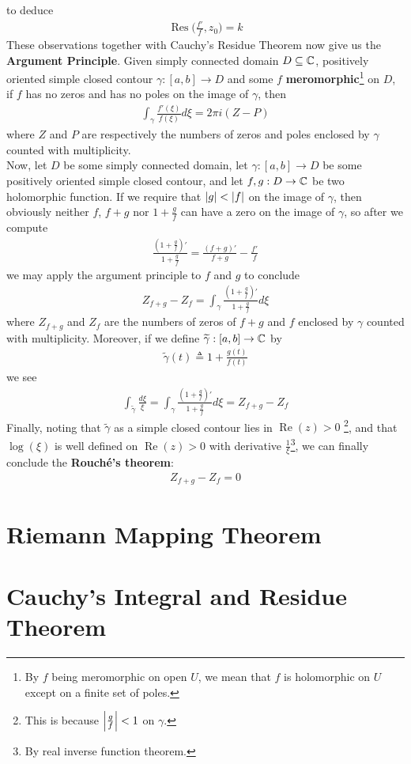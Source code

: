 \documentclass{report}
\begin{document}
to deduce 
\begin{align*}
\operatorname{Res}\Big(\frac{f'}{f},z_0 \Big)=k
\end{align*}
These observations together with Cauchy's Residue Theorem now give us the \textbf{Argument Principle}. Given simply connected domain $D\subseteq \mathbb{C}$, positively oriented simple closed contour $\gamma :[a,b]\rightarrow D$ and some $f$ \textbf{meromorphic}\footnote{By $f$ being meromorphic on open $U$, we mean that $f$ is holomorphic on $U$ except on a finite set of poles.} on $D$, if $f$ has no zeros and has no poles on the image of $\gamma $, then   
\begin{align*}
\int_{\gamma } \frac{f'(\xi)}{f(\xi)}d\xi = 2\pi  i (Z-P)
\end{align*}
where $Z$ and $P$ are respectively the numbers of zeros and poles enclosed by $\gamma $ counted with multiplicity.   \\

Now, let $D$ be some simply connected domain,  let $\gamma :[a,b]\rightarrow D$ be some positively oriented simple closed contour, and let $f,g:D\rightarrow \mathbb{C}$ be two holomorphic function. If we require that $\left|g\right|<\left|f\right|$ on the image of $\gamma $, then obviously neither $f$, $f+g$ nor $1+\frac{g}{f}$ can have a zero on the image of $\gamma $, so after we compute 
\begin{align*}
\frac{(1+\frac{g}{f})'}{1+ \frac{g}{f}}=\frac{(f+g)'}{f+g}- \frac{f'}{f} 
\end{align*}
we may apply the argument principle to $f$ and  $g$ to conclude 
\begin{align*}
Z_{f+g}-Z_f= \int_{\gamma } \frac{(1+\frac{g}{f})'}{1+\frac{g}{f}}d\xi
\end{align*}
where $Z_{f+g}$ and $Z_f$ are the numbers of zeros of  $f+g$ and  $f$ enclosed by $\gamma $ counted with multiplicity. Moreover, if we define $\widetilde{\gamma }:[a,b]\rightarrow \mathbb{C} $ by 
\begin{align*}
\tilde{\gamma }(t)\triangleq  1 + \frac{g(t)}{f(t)} 
\end{align*}
we see 
\begin{align*}
\int_{\tilde{\gamma }} \frac{d\xi}{\xi}= \int_{\gamma } \frac{(1+ \frac{g}{f})'}{1+\frac{g}{f}}d\xi = Z_{f+g}-Z_f 
\end{align*}
Finally, noting that $\tilde{\gamma }$ as a simple closed contour lies in $\operatorname{Re}(z)>0$ \footnote{This is because  $\left|\frac{g}{f}\right|<1$ on $\gamma $.}, and that $\log(\xi)$ is well defined on $\operatorname{Re}(z)>0$ with derivative $\frac{1}{\xi}$\footnote{By real inverse function theorem.}, we can finally conclude the \textbf{Rouché's theorem}: 
\begin{align*}
Z_{f+g}-Z_f=0
\end{align*}
\section{Riemann Mapping Theorem}
\section{Cauchy's Integral and Residue Theorem}
\label{CITA}
\end{document}
